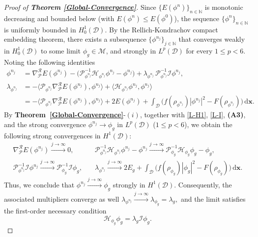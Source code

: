 \documentclass[preprint,3p]{elsarticle}
\begin{document}
\begin{proof}[Proof of {\bf Theorem \ref{Global-Convergence}}]
	Since $\{E(\phi^n)\}_{n\in\mathbb{N}}$ is monotonic decreasing and bounded below (with $E(\phi^n)\le E(\phi^0)$), the sequence $\{\phi^n\}_{n\in\mathbb{N}}$ is uniformly bounded in $H_0^1(\mathcal{D})$. {By the Rellich-Kondrachov compact embedding theorem, there exists a subsequence $\{\phi^{n_j}\}_{j\in\mathbb{N}}$ that converges weakly in $H_0^1(\mathcal{D})$ to some limit $\phi_g \in \mathcal{M}$, and strongly in $L^p(\mathcal{D})$ for every $1 \leq p < 6$. Noting the following identities
	\begin{align*}
	\phi^{n_j}
	&= \nabla^{\mathcal{R}}_{\mathcal{P}} E(\phi^{n_j})
	- \big(\mathcal{P}^{-1}_{\phi^{n_j}} \mathcal{H}_{\phi^{n_j}} \phi^{n_j}
	- \phi^{n_j}\big)
	+ \lambda_{\phi^{n_j}} \, \mathcal{P}^{-1}_{\phi^{n_j}} \mathcal{I} \phi^{n_j},\\
	\lambda_{\phi^{n_j}}
		&= -\big\langle \mathcal{P}_{\phi^{n_j}} \nabla^{\mathcal{R}}_{\mathcal{P}} E(\phi^{n_j}), \phi^{n_j} \big\rangle
		+ \big\langle \mathcal{H}_{\phi^{n_j}} \phi^{n_j}, \phi^{n_j} \big\rangle \\
		&= -\big\langle \mathcal{P}_{\phi^{n_j}} \nabla^{\mathcal{R}}_{\mathcal{P}} E(\phi^{n_j}), \phi^{n_j} \big\rangle
		+ 2E(\phi^{n_j})
		+ \int_{\mathcal{D}} \Big( f(\rho_{\phi^{n_j}}) |\phi^{n_j}|^2 - F(\rho_{\phi^{n_j}}) \Big) \, \mathrm{d}\bm{x}.
	\end{align*}
	By {\bf Theorem~\ref{Global-Convergence}}-$(i)$, together with \eqref{L-H1}, \eqref{L-I}, {\bf (A3)}, and the strong convergence $\phi^{n_j} \to \phi_g$ in $L^p(\mathcal{D})$ ($1 \leq p < 6$), we obtain the following strong convergences in $H^1(\mathcal{D})$:
	\begin{align*}
		\nabla^{\mathcal{R}}_{\mathcal{P}} E(\phi^{n_j}) \xrightarrow{j \to \infty} 0, \quad
		&\mathcal{P}^{-1}_{\phi^{n_j}} \mathcal{H}_{\phi^{n_j}} \phi^{n_j} - \phi^{n_j} \xrightarrow{j \to \infty} \mathcal{P}^{-1}_{\phi_g} \mathcal{H}_{\phi_g} \phi_g - \phi_g,\\
		 \mathcal{P}^{-1}_{\phi^{n_j}} \mathcal{I} \phi^{n_j} \xrightarrow{j \to \infty} \mathcal{P}^{-1}_{\phi_g} \mathcal{I} \phi_g, \quad
		&\lambda_{\phi^{n_j}} \xrightarrow{j \to \infty} 2E_g + \int_{\mathcal{D}} \Big( f(\rho_{\phi_g}) |\phi_g|^2 - F(\rho_{\phi_g}) \Big) \, \mathrm{d}\bm{x}.
	\end{align*}
	Thus, we conclude that 
	$\phi^{n_j} \xrightarrow{j \to \infty} \phi_g$ strongly in $H^1(\mathcal{D})$. Consequently, the associated multipliers converge as well
	$
	\lambda_{\phi^{n_j}} \xrightarrow{j \to \infty} \lambda_{\phi_g} = \lambda_g,
	$ and the limit satisfies the first-order necessary condition
	\[
	\mathcal{H}_{\phi_g} \phi_g = \lambda_g \mathcal{I} \phi_g.
	\]}
\end{proof}
\end{document}
